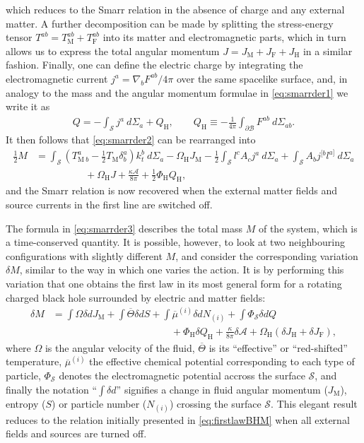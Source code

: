 \documentclass[
twoside,
openright,
frontopenright,
]{dmathesis}
\newcommand{\nn}{\nonumber}
\begin{document}
which reduces to the Smarr relation in the absence of charge and any external
matter. A further decomposition can be made by splitting the stress-energy
tensor $T^{ab} = T_\mathrm{M}^{ab} + T_\mathrm{F}^{ab}$ into its matter and
electromagnetic parts, which in turn allows us to express the total angular
momentum $J = J_\mathrm{M} + J_\mathrm{F} + J_\mathrm{H}$ in a similar
fashion. Finally, one can define the electric charge by integrating the
electromagnetic current $j^a = \nabla_b F^{ab}/4\pi$ over the same spacelike
surface, and, in analogy to the mass and the angular momentum formulae in
\cref{eq:smarrder1} we write it as
\begin{align}
  Q = -\int_\mathcal{S} j^a ~d\Sigma_a + Q_\mathrm{H}, \qquad Q_\mathrm{H} \equiv -\frac{1}{4\pi}\int_{\partial\mathcal{B}}F^{ab} ~ d\Sigma_{ab}.
\end{align}
It then follows that \cref{eq:smarrder2} can be rearranged into
\begin{align}
  \label{eq:smarrder3}
  \frac12 M &= \int_\mathcal{S} \left(T^a_{\mathrm{M}~b} - \frac12 T_\mathrm{M}
  \delta^a_b\right)k_t^b~d\Sigma_a - \Omega_\mathrm{H} J_\mathrm{M} - \frac12
\int_\mathcal{S} l^c A_c j^a~d\Sigma_a + \int_\mathcal{S} A_b j^{[b}l^{a]}~d\Sigma_a \nn\\
&\hspace{5em}+ \Omega_\mathrm{H} J + \frac{\kappa \mathcal{A}}{8\pi} + \frac12
\Phi_\mathrm{H} Q_\mathrm{H},
\end{align}
and the Smarr relation is now recovered when the external matter fields and
source currents in the first line are switched off.

The formula in \cref{eq:smarrder3} describes the total mass $M$ of the system,
which is a time-conserved quantity. It is possible, however, to look at two
neighbouring configurations with slightly different $M$, and consider the
corresponding variation $\delta M$, similar to the way in which one varies the
action. It is by performing this variation that one obtains the first law in its
most general form for a rotating charged black hole surrounded by electric and
matter fields:
\begin{align}
  \label{eq:firstlawder1}
  \delta M &= \int \Omega\delta dJ_\mathrm{M} + \int \overline{\Theta}\delta dS +
  \int \overline{\mu}^{(i)} \delta dN_{(i)} +\int \Phi_\mathcal{S}\delta dQ \nn\\
  &\hspace{12em}+ \Phi_\mathrm{H} \delta
  Q_\mathrm{H} + \frac{\kappa}{8\pi}\delta\mathcal{A} + \Omega_\mathrm{H}(\delta
  J_\mathrm{H}+\delta J_\mathrm{F}),
\end{align}
where $\Omega$ is the angular velocity of the fluid, $\overline{\Theta}$ is its
``effective'' or ``red-shifted'' temperature, $\overline{\mu}^{(i)}$ the
effective chemical potential corresponding to each type of particle,
$\Phi_\mathcal{S}$ denotes the electromagnetic potential accross the surface
$\mathcal{S}$, and finally the notation ``$\int\delta d$'' signifies a change in
fluid angular momentum ($J_\mathrm{M}$), entropy ($S$) or particle number
($N_{(i)}$) crossing the surface $\mathcal{S}$. This elegant result reduces to
the relation initially presented in \cref{eq:firstlawBHM} when all external
fields and sources are turned off.
\end{document}
